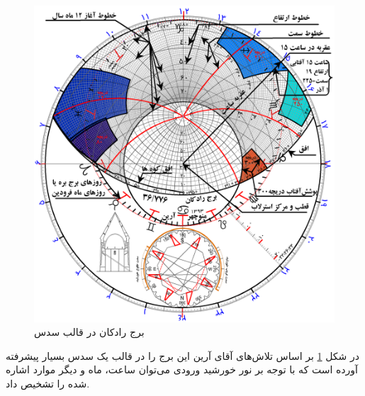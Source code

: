 \documentclass{article}
\begin{document}
	\begin{figure}[h!]
			\includegraphics[width=\linewidth]{figures/r5.png}
			\caption{برج رادکان در قالب سدس}
			\label{radkandosos}
		\end{figure}
		
		
		
		
	در شکل \ref{radkandosos} بر اساس تلاش‌های آقای آرین این برج را در قالب یک سدس بسیار پیشرفته آورده است که با توجه بر نور خورشید ورودی می‌توان ساعت، ماه  و دیگر موارد اشاره شده را تشخیص داد.   
\end{document}
